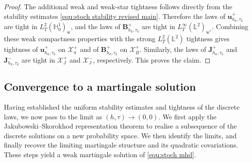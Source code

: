 \documentclass[11pt, reqno]{amsart}
\theoremstyle{definition}
\numberwithin{equation}{section}
\newcommand{\bff}{\boldsymbol}
\newcommand{\bb}{\mathbb}
\begin{document}
\begin{proof}
	The additional weak and weak-star tightness follows directly from the
	stability estimates \eqref{equ:stoch stability revised main}.
	Therefore the laws of $\bff u_{h_k,\tau_k}^{+}$ are tight in
	$L^2_T(\bb H_0^1)_{\mathrm w}$, and the laws of
	$\bff B_{h_k,\tau_k}^{+}$ are tight in
	$L^\infty_T(\bb L^2)_{\mathrm w^*}$. Combining these weak compactness
	properties with the strong $L^2_T(\bb L^2)$ tightness gives tightness of
	$\bff u_{h_k,\tau_k}^{+}$ on $\mathcal X_u^{+}$ and of
	$\bff B_{h_k,\tau_k}^{+}$ on $\mathcal X_B^{+}$. Similarly, the
	laws of $\bff J_{h_k,\tau_k}^{+}$ and $\bff J_{h_k,\tau_k}^{-}$ are tight in
	$\mathcal X_J^{+}$ and $\mathcal X_J^{-}$, respectively.
	This proves the claim.
\end{proof}




\subsection{Convergence to a martingale solution}

Having established the uniform stability estimates and tightness of the discrete laws, we now pass to the limit as $(h,\tau)\to(0,0)$. We first apply the Jakubowski--Skorokhod representation theorem to realise a subsequence of the discrete solutions on a new probability space. We then identify the limits, and finally recover the limiting martingale structure and its quadratic covariations. These steps yield a weak martingale solution of \eqref{equ:stoch mhd}.
\end{document}
